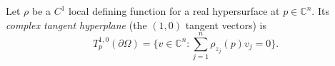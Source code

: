 
Let $\rho$ be a $C^1$ local defining function for a real hypersurface at $p\in\mathbb C^n$. Its \emph{complex tangent hyperplane} (the $(1,0)$ tangent vectors) is
\[
T_p^{1,0}(\partial\Omega)=\{v\in\mathbb C^n:\sum_{j=1}^n\rho_{z_j}(p)v_j=0\}.
\]
